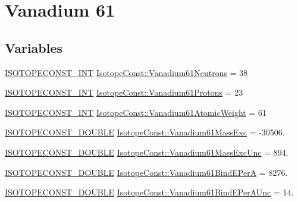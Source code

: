 \hypertarget{group___isotope_const-_vanadium-_v61}{}\section{Vanadium 61}
\label{group___isotope_const-_vanadium-_v61}
\subsection*{Variables}
\begin{DoxyCompactItemize}
\item 
\mbox{\hyperlink{group___isotope_const-_macros_ga5f18360b3e99483a35c32d789e62621c}{I\+S\+O\+T\+O\+P\+E\+C\+O\+N\+S\+T\+\_\+\+I\+NT}} \mbox{\hyperlink{group___isotope_const-_vanadium-_v61_ga8048146f1ad12eb26ec56d9cab7fa6c3}{Isotope\+Const\+::\+Vanadium61\+Neutrons}} = 38
\item 
\mbox{\hyperlink{group___isotope_const-_macros_ga5f18360b3e99483a35c32d789e62621c}{I\+S\+O\+T\+O\+P\+E\+C\+O\+N\+S\+T\+\_\+\+I\+NT}} \mbox{\hyperlink{group___isotope_const-_vanadium-_v61_ga5c25700c69360b5a5e7ee59717cb2cc0}{Isotope\+Const\+::\+Vanadium61\+Protons}} = 23
\item 
\mbox{\hyperlink{group___isotope_const-_macros_ga5f18360b3e99483a35c32d789e62621c}{I\+S\+O\+T\+O\+P\+E\+C\+O\+N\+S\+T\+\_\+\+I\+NT}} \mbox{\hyperlink{group___isotope_const-_vanadium-_v61_ga5d5eb001a200237c54af6582c6ad8067}{Isotope\+Const\+::\+Vanadium61\+Atomic\+Weight}} = 61
\item 
\mbox{\hyperlink{group___isotope_const-_macros_ga8f45a7272ce02c0b4c65c44636ed719a}{I\+S\+O\+T\+O\+P\+E\+C\+O\+N\+S\+T\+\_\+\+D\+O\+U\+B\+LE}} \mbox{\hyperlink{group___isotope_const-_vanadium-_v61_ga72a9513a3915acb0f7d0b00bbad803b7}{Isotope\+Const\+::\+Vanadium61\+Mass\+Exc}} = -\/30506.
\item 
\mbox{\hyperlink{group___isotope_const-_macros_ga8f45a7272ce02c0b4c65c44636ed719a}{I\+S\+O\+T\+O\+P\+E\+C\+O\+N\+S\+T\+\_\+\+D\+O\+U\+B\+LE}} \mbox{\hyperlink{group___isotope_const-_vanadium-_v61_ga201fe7b3d518a3a169623b7056006ff9}{Isotope\+Const\+::\+Vanadium61\+Mass\+Exc\+Unc}} = 894.
\item 
\mbox{\hyperlink{group___isotope_const-_macros_ga8f45a7272ce02c0b4c65c44636ed719a}{I\+S\+O\+T\+O\+P\+E\+C\+O\+N\+S\+T\+\_\+\+D\+O\+U\+B\+LE}} \mbox{\hyperlink{group___isotope_const-_vanadium-_v61_ga20cbacef4d194a773c67fa2182e7d6f6}{Isotope\+Const\+::\+Vanadium61\+Bind\+E\+PerA}} = 8276.
\item 
\mbox{\hyperlink{group___isotope_const-_macros_ga8f45a7272ce02c0b4c65c44636ed719a}{I\+S\+O\+T\+O\+P\+E\+C\+O\+N\+S\+T\+\_\+\+D\+O\+U\+B\+LE}} \mbox{\hyperlink{group___isotope_const-_vanadium-_v61_gaafa7aa1ca4e384cdf36dc977a0a8d386}{Isotope\+Const\+::\+Vanadium61\+Bind\+E\+Per\+A\+Unc}} = 14.

\end{DoxyCompactItemize}
